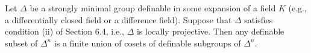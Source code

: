 Let $\Delta$ be a strongly minimal group definable in some expansion of a field $K$ (e.g., a differentially closed field or a difference field). Suppose that $\Delta$ satisfies condition (ii) of Section 6.4, i.e., $\Delta$ is locally projective. Then any definable subset of $\Delta^n$ is a finite union of cosets of definable subgroups of $\Delta^n$.
